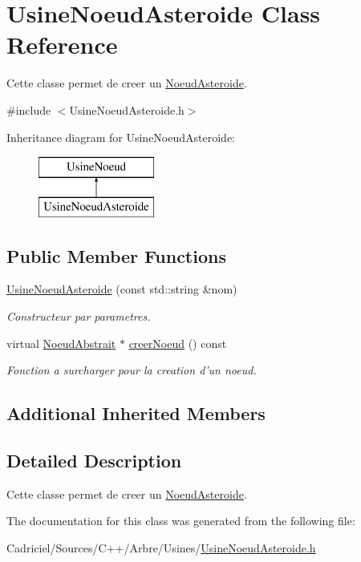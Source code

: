 \hypertarget{class_usine_noeud_asteroide}{\section{Usine\-Noeud\-Asteroide Class Reference}
\label{class_usine_noeud_asteroide}
}


Cette classe permet de creer un \hyperlink{class_noeud_asteroide}{Noeud\-Asteroide}.  




{\ttfamily \#include $<$Usine\-Noeud\-Asteroide.\-h$>$}

Inheritance diagram for Usine\-Noeud\-Asteroide\-:\begin{figure}[H]
\begin{center}
\leavevmode
\includegraphics[height=2.000000cm]{class_usine_noeud_asteroide}
\end{center}
\end{figure}
\subsection*{Public Member Functions}
\begin{DoxyCompactItemize}
\item 
\hyperlink{group__inf2990_gad56a23460b8dd5d59b678bca856e80ca}{Usine\-Noeud\-Asteroide} (const std\-::string \&nom)
\begin{DoxyCompactList}\small\item\em Constructeur par parametres. \end{DoxyCompactList}\item 
virtual \hyperlink{class_noeud_abstrait}{Noeud\-Abstrait} $\ast$ \hyperlink{group__inf2990_gab6be7e595c0cfed194ec12d49aca928a}{creer\-Noeud} () const 
\begin{DoxyCompactList}\small\item\em Fonction a surcharger pour la creation d'un noeud. \end{DoxyCompactList}\end{DoxyCompactItemize}
\subsection*{Additional Inherited Members}


\subsection{Detailed Description}
Cette classe permet de creer un \hyperlink{class_noeud_asteroide}{Noeud\-Asteroide}. 

The documentation for this class was generated from the following file\-:\begin{DoxyCompactItemize}
\item 
Cadriciel/\-Sources/\-C++/\-Arbre/\-Usines/\hyperlink{_usine_noeud_asteroide_8h}{Usine\-Noeud\-Asteroide.\-h}\end{DoxyCompactItemize}

